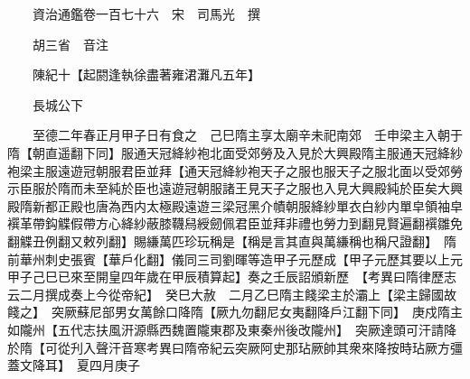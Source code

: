










 


 
 


 

  
  
  
  
  





  
  
  
  
  
 
  

  

  
  
  



  

 
 

  
   




  

  
  


  　　資治通鑑卷一百七十六　宋　司馬光　撰

　　胡三省　音注

　　陳紀十【起閼逢執徐盡著雍涒灘凡五年】

　　長城公下

　　至德二年春正月甲子日有食之　己巳隋主享太廟辛未祀南郊　壬申梁主入朝于隋【朝直遥翻下同】服通天冠絳紗袍北面受郊勞及入見於大興殿隋主服通天冠絳紗袍梁主服遠遊冠朝服君臣並拜【通天冠絳紗袍天子之服也服天子之服北面以受郊勞示臣服於隋而未至純於臣也遠遊冠朝服諸王見天子之服也入見大興殿純於臣矣大興殿隋新都正殿也唐為西内太極殿遠遊三梁冠黑介幘朝服絳紗單衣白紗内單皁領袖皁襈革帶鈎䚢假帶方心絳紗蔽膝韈舄綬劒佩君臣並拜非禮也勞力到翻見賢遍翻襈雛免翻䚢丑例翻又敕列翻】賜縑萬匹珍玩稱是【稱是言其直與萬縑稱也稱尺證翻】　隋前華州刺史張賓【華戶化翻】儀同三司劉暉等造甲子元歷成【甲子元歷其要以上元甲子己巳已來至開皇四年歲在甲辰積算起】奏之壬辰詔頒新歷　【考異曰隋律歷志云二月撰成奏上今從帝紀】　癸巳大赦　二月乙巳隋主餞梁主於灞上【梁主歸國故餞之】　突厥蘇尼部男女萬餘口降隋【厥九勿翻尼女夷翻降戶江翻下同】　庚戍隋主如隴州【五代志扶風汧源縣西魏置隴東郡及東秦州後改隴州】　突厥達頭可汗請降於隋【可從刋入聲汗音寒考異曰隋帝紀云突厥阿史那玷厥帥其衆來降按時玷厥方彊蓋文降耳】　夏四月庚子

